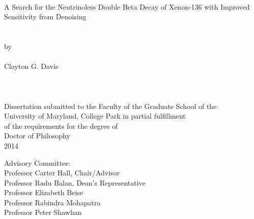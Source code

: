 
\thispagestyle{empty}
\hbox{\ }
\vspace{1in}
\renewcommand{\baselinestretch}{1}
\small\normalsize
\begin{center}

\large{{A Search for the Neutrinoless Double Beta Decay of Xenon-136 with Improved Sensitivity from Denoising}}\\
\ \\
\ \\
\large{by} \\
\ \\
\large{Clayton G. Davis}%
\ \\
\ \\
\ \\
\ \\
\normalsize
Dissertation submitted to the Faculty of the Graduate School of the \\
University of Maryland, College Park in partial fulfillment \\
of the requirements for the degree of \\
Doctor of Philosophy \\
2014
\end{center}

\vspace{7.5em}

\noindent Advisory Committee: \\
Professor Carter Hall, Chair/Advisor \\
Professor Radu Balan, Dean's Representative \\
Professor Elizabeth Beise \\
Professor Rabindra Mohapatra \\
Professor Peter Shawhan
